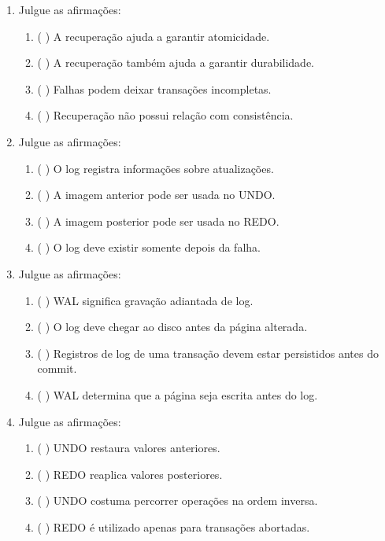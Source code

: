 \documentclass[12pt,a4paper]{article}
\begin{document}
\begin{enumerate}[resume,label=\textbf{Q\arabic*.}]

\item Julgue as afirmações:

\begin{enumerate}[label=\alph*)]
    \item ( \quad ) A recuperação ajuda a garantir atomicidade.
    \item ( \quad ) A recuperação também ajuda a garantir durabilidade.
    \item ( \quad ) Falhas podem deixar transações incompletas.
    \item ( \quad ) Recuperação não possui relação com consistência.
\end{enumerate}

\item Julgue as afirmações:

\begin{enumerate}[label=\alph*)]
    \item ( \quad ) O log registra informações sobre atualizações.
    \item ( \quad ) A imagem anterior pode ser usada no UNDO.
    \item ( \quad ) A imagem posterior pode ser usada no REDO.
    \item ( \quad ) O log deve existir somente depois da falha.
\end{enumerate}

\item Julgue as afirmações:

\begin{enumerate}[label=\alph*)]
    \item ( \quad ) WAL significa gravação adiantada de log.
    \item ( \quad ) O log deve chegar ao disco antes da página alterada.
    \item ( \quad ) Registros de log de uma transação devem estar persistidos antes do commit.
    \item ( \quad ) WAL determina que a página seja escrita antes do log.
\end{enumerate}

\item Julgue as afirmações:

\begin{enumerate}[label=\alph*)]
    \item ( \quad ) UNDO restaura valores anteriores.
    \item ( \quad ) REDO reaplica valores posteriores.
    \item ( \quad ) UNDO costuma percorrer operações na ordem inversa.
    \item ( \quad ) REDO é utilizado apenas para transações abortadas.
\end{enumerate}


\end{enumerate}
\end{document}
